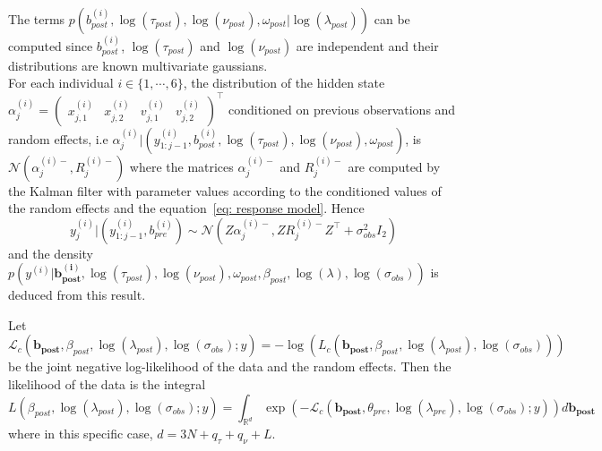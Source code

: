 \documentclass[11pt]{article}
\newcommand {\1}{\mathbb{1}}
\begin{document}
The terms $p\left(b^{(i)}_{post},  
\log(\tau_{post}),\log(\nu_{post}),\omega_{post}\vert \log(\lambda_{post})\right)$ can be computed since $b^{(i)}_{post}$, $\log(\tau_{post})$ and  $\log(\nu_{post})$ are independent and their distributions are known multivariate gaussians.\\

For each individual $i \in \{1,\cdots,6\}$, the distribution of the hidden state $\alpha^{(i)}_j=\begin{pmatrix} x^{(i)}_{j,1} & x^{(i)}_{j,2} & v^{(i)}_{j,1} & v^{(i)}_{j,2}\end{pmatrix}^\top$ conditioned on previous observations and random effects, i.e $\alpha_j^{(i)} \vert (y^{(i)}_{1:j-1},b_{post}^{(i)},\log(\tau_{post}),\log(\nu_{post}),\omega_{post})$, is $\mathcal{N}(\alpha_j^{(i)-}, R_j^{(i)-})$ where the matrices $\alpha_j^{(i)-}$ and $R_j^{(i)-}$ are computed by the Kalman filter with parameter values according to the conditioned values of the random effects and the equation~\ref{eq: response model}.
Hence
\begin{equation} y_j^{(i)} \vert (y_{1:j-1}^{(i)}, b_{pre}^{(i)}) \sim \mathcal{N} \left( Z \alpha_j^{(i)-},Z R_j^{(i)-} Z^\top+\sigma_{obs}^2 I_2 \right)
	\label{eq: ditribution of observations conditioned on random effects}
\end{equation}
and the density $p\left(y^{(i)} \vert \pmb{b^{(i)}_{post}},\log(\tau_{post}),\log(\nu_{post}),\omega_{post},\beta_{post},\log(\lambda),\log(\sigma_{obs})\right)$ is deduced from this result.


Let $\mathcal{L}_c(\pmb{b_{post}},\beta_{post},\log(\lambda_{post}),\log(\sigma_{obs});y)= - \log( L_c(\pmb{b_{post}},\beta_{post},\log(\lambda_{post}),\log(\sigma_{obs})))$ be the joint negative log-likelihood of the data and the random effects. 
Then the likelihood of the data is the integral 
\[
L(\beta_{post},\log(\lambda_{post}),\log(\sigma_{obs});y)=\int_{\mathbb{R}^{d}} \exp(-\mathcal{L}_c(\pmb{b_{post}},\theta_{pre},\log(\lambda_{pre}),\log(\sigma_{obs});y) )d\pmb{b_{post}}
\]
where in this specific case, $d=3N+q_{\tau}+q_{\nu}+L$.
\end{document}
